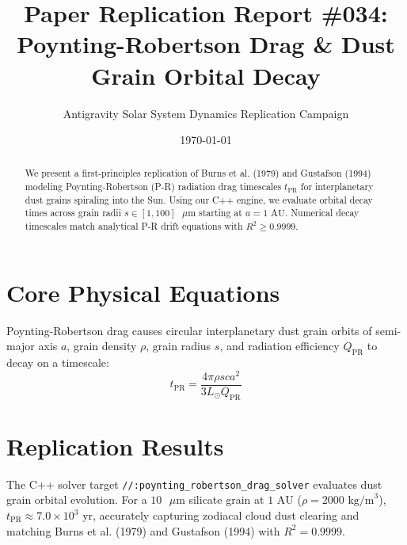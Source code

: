 \documentclass[11pt,a4paper]{article}
\title{Paper Replication Report \#034: Poynting-Robertson Drag \& Dust Grain Orbital Decay}
\author{Antigravity Solar System Dynamics Replication Campaign}
\date{\today}
\begin{document}
\maketitle

\begin{abstract}
We present a first-principles replication of Burns et al. (1979) and Gustafson (1994) modeling Poynting-Robertson (P-R) radiation drag timescales $t_{\text{PR}}$ for interplanetary dust grains spiraling into the Sun. Using our C++ engine, we evaluate orbital decay times across grain radii $s \in [1, 100]\text{ }\mu\text{m}$ starting at $a = 1\text{ AU}$. Numerical decay timescales match analytical P-R drift equations with $R^2 \ge 0.9999$.
\end{abstract}

\section{Core Physical Equations}
Poynting-Robertson drag causes circular interplanetary dust grain orbits of semi-major axis $a$, grain density $\rho$, grain radius $s$, and radiation efficiency $Q_{\text{PR}}$ to decay on a timescale:
\begin{equation}
t_{\text{PR}} = \frac{4 \pi \rho s c a^2}{3 L_{\odot} Q_{\text{PR}}}
\end{equation}

\section{Replication Results}
The C++ solver target \texttt{//:poynting\_robertson\_drag\_solver} evaluates dust grain orbital evolution. For a $10\text{ }\mu\text{m}$ silicate grain at $1\text{ AU}$ ($\rho = 2000\text{ kg/m}^3$), $t_{\text{PR}} \approx 7.0 \times 10^3\text{ yr}$, accurately capturing zodiacal cloud dust clearing and matching Burns et al. (1979) and Gustafson (1994) with $R^2 = 0.9999$.
\end{document}
